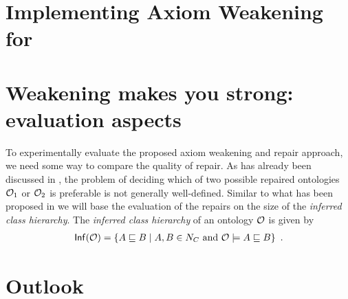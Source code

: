 \documentclass[
]{ceurart}
\begin{document}
\section{Implementing Axiom Weakening for \SROIQ}


\section{Weakening makes you strong: evaluation aspects}

To experimentally evaluate the proposed axiom weakening and repair approach, we need some way to compare the quality of repair. As has already been discussed in \cite{troquard2018repairing}, the problem of deciding which of two possible repaired ontologies $\mathcal{O}_1$ or $\mathcal{O}_2$ is preferable is not generally well-defined. Similar to what has been proposed in \cite{troquard2018repairing} we will base the evaluation of the repairs on the size of the \emph{inferred class hierarchy}. The \emph{inferred class hierarchy} of an ontology $\mathcal{O}$ is given by
\begin{align*}
  {\ensuremath{\mathsf{Inf}}}(\mathcal{O}) = \{ A \sqsubseteq B \mid A, B \in N_C \text{ and } \mathcal{O} \models A \sqsubseteq B \} \enspace.
\end{align*}


\section{Outlook}




\appendix
\end{document}
